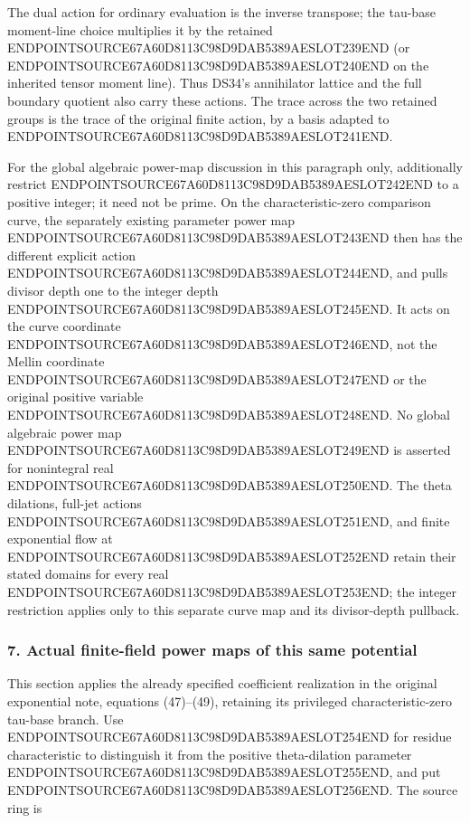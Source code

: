 The dual action for ordinary evaluation is the inverse transpose; the tau-base moment-line choice multiplies it by the retained ENDPOINTSOURCE67A60D8113C98D9DAB5389AESLOT239END (or ENDPOINTSOURCE67A60D8113C98D9DAB5389AESLOT240END on the inherited tensor moment line). Thus DS34's annihilator lattice and the full boundary quotient also carry these actions. The trace across the two retained groups is the trace of the original finite action, by a basis adapted to ENDPOINTSOURCE67A60D8113C98D9DAB5389AESLOT241END.

For the global algebraic power-map discussion in this paragraph only, additionally restrict ENDPOINTSOURCE67A60D8113C98D9DAB5389AESLOT242END to a positive integer; it need not be prime. On the characteristic-zero comparison curve, the separately existing parameter power map ENDPOINTSOURCE67A60D8113C98D9DAB5389AESLOT243END then has the different explicit action ENDPOINTSOURCE67A60D8113C98D9DAB5389AESLOT244END, and pulls divisor depth one to the integer depth ENDPOINTSOURCE67A60D8113C98D9DAB5389AESLOT245END. It acts on the curve coordinate ENDPOINTSOURCE67A60D8113C98D9DAB5389AESLOT246END, not the Mellin coordinate ENDPOINTSOURCE67A60D8113C98D9DAB5389AESLOT247END or the original positive variable ENDPOINTSOURCE67A60D8113C98D9DAB5389AESLOT248END. No global algebraic power map ENDPOINTSOURCE67A60D8113C98D9DAB5389AESLOT249END is asserted for nonintegral real ENDPOINTSOURCE67A60D8113C98D9DAB5389AESLOT250END. The theta dilations, full-jet actions ENDPOINTSOURCE67A60D8113C98D9DAB5389AESLOT251END, and finite exponential flow at ENDPOINTSOURCE67A60D8113C98D9DAB5389AESLOT252END retain their stated domains for every real ENDPOINTSOURCE67A60D8113C98D9DAB5389AESLOT253END; the integer restriction applies only to this separate curve map and its divisor-depth pullback.

\subsubsection{7. Actual finite-field power maps of this same potential}\label{endpoint-f1_scaling--actual-finite-field-power-maps-of-this-same-potential}

This section applies the already specified coefficient realization in the original exponential note, equations (47)--(49), retaining its privileged characteristic-zero tau-base branch. Use ENDPOINTSOURCE67A60D8113C98D9DAB5389AESLOT254END for residue characteristic to distinguish it from the positive theta-dilation parameter ENDPOINTSOURCE67A60D8113C98D9DAB5389AESLOT255END, and put ENDPOINTSOURCE67A60D8113C98D9DAB5389AESLOT256END. The source ring is

